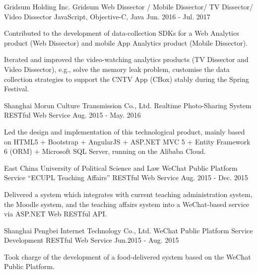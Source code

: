 \begin{cventries}
  \cventry
    {Gridsum Holding Inc.}
    {Gridsum Web Dissector / Mobile Dissector/ TV Dissector/ Video Dissector}
    {JavaScript, Objective-C, Java}
    {Jun. 2016 - Jul. 2017}
    {
      \begin{cvitems}
        \item {Contributed to the development of data-collection SDKs for a Web Analytics product (Web Dissector) and mobile App Analytics product (Mobile Dissector).}
        \item {Iterated and improved the video-watching analytics products (TV Dissector and Video Dissector), e.g., solve the memory leak problem, customise the data collection strategies to support the CNTV App (CBox) stably during the Spring Festival.}
      \end{cvitems}
    }
    
  \cventry
    {Shanghai Morun Culture Transmission Co., Ltd.}
    {Realtime Photo-Sharing System}
    {RESTful Web Service}
    {Aug. 2015 - May. 2016}
    {
      \begin{cvitems}
        \item {Led the design and implementation of this technological product, mainly based on HTML5 + Bootstrap + AngularJS + ASP.NET MVC 5 + Entity Framework 6 (ORM) + Microsoft SQL Server, running on the Alibaba Cloud.}
      \end{cvitems}
    }
    
  \cventry
    {East China University of Political Science and Law}
    {WeChat Public Platform Service “ECUPL Teaching Affairs”}
    {RESTful Web Service}
    {Aug. 2015 - Dec. 2015}
    {
      \begin{cvitems}
        \item {Delivered a system which integrates with current teaching administration system, the Moodle system, and the teaching affairs system into a WeChat-based service via ASP.NET Web RESTful API.}
      \end{cvitems}
    }
    
  \cventry
    {Shanghai Pengbei Internet Technology Co., Ltd.}
    {WeChat Public Platform Service Development}
    {RESTful Web Service}
    {Jun.2015 - Aug. 2015}
    {
      \begin{cvitems}
        \item {Took charge of the development of a food-delivered system based on the WeChat Public Platform.}
      \end{cvitems}
    }
    

\end{cventries}
